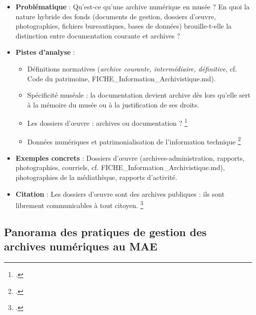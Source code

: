 \begin{itemize}
	\item \textbf{Problématique} : Qu’est-ce qu’une archive numérique en musée ? En quoi la nature hybride des fonds (documents de gestion, dossiers d’œuvre, photographies, fichiers bureautiques, bases de données) brouille-t-elle la distinction entre documentation courante et archives ?
	\item \textbf{Pistes d’analyse} : 
	\begin{itemize}
		\item Définitions normatives (\textit{archive courante, intermédiaire, définitive}, cf. Code du patrimoine, FICHE\_Information\_Archivistique.md).
		\item Spécificité muséale : la documentation devient archive dès lors qu’elle sert à la mémoire du musée ou à la justification de ses droits.
		\item Les dossiers d’œuvre : archives ou documentation ? \footcite{barbelinDossierDoeuvreDossier2016a}
		\item Données numériques et patrimonialisation de l’information technique \footcite{bechardArchivesElectroniques2020a}
	\end{itemize}
	\item \textbf{Exemples concrets} : Dossiers d’œuvre (archives-administration, rapports, photographies, courriels, cf. FICHE\_Information\_Archivistique.md), photographies de la médiathèque, rapports d’activité.
	\item \textbf{Citation} : \og Les dossiers d’œuvre sont des archives publiques : ils sont librement communicables à tout citoyen. \fg \footcite{barbelinDossierDoeuvreDossier2016a}
\end{itemize}

\subsection{Panorama des pratiques de gestion des archives numériques au MAE}

